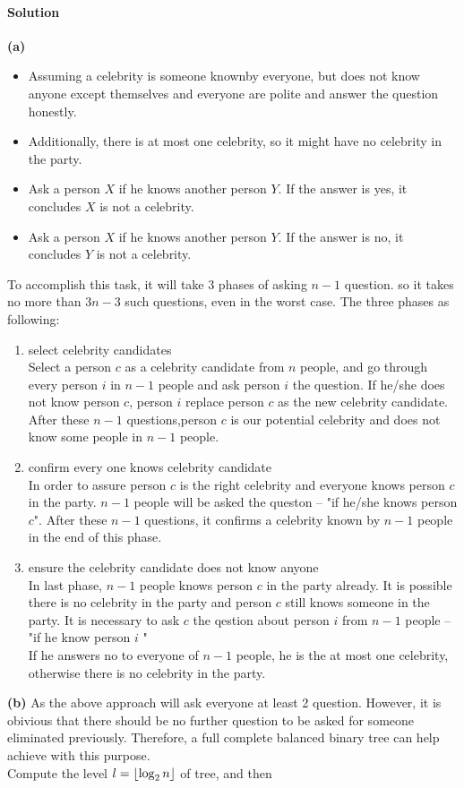 \documentclass[a4paper]{scrartcl}
\begin{document}
\paragraph{Solution}
{\bfseries(a)}
\begin{itemize}
  \item Assuming a celebrity is someone knownby everyone, but does not know anyone except themselves and everyone are polite and answer the question honestly.
  \item Additionally, there is at most one celebrity, so it might have no celebrity in the party.
  \item Ask a person $X$ if he knows another person $Y$. If the answer is yes, it concludes $X$ is not a celebrity.
  \item Ask a person $X$ if he knows another person $Y$. If the answer is no, it concludes $Y$ is not a celebrity.
\end{itemize}
To accomplish this task, it will take 3 phases of asking $n-1$ question. so it takes no more than $3n-3$ such questions, even in the worst case.
The three phases as following:
\begin{enumerate}
  \item select celebrity candidates\\
  Select a person $c$ as a celebrity candidate from $n$ people, and go through every person $i$ in $n-1$ people and ask person $i$ the question. If he/she does not know person $c$, person $i$ replace person $c$ as the new celebrity candidate. After these $n-1$ questions,person $c$ is our potential celebrity and does not know some people in $n-1$ people.
  \item confirm every one knows celebrity candidate\\
  In order to assure person $c$ is the right celebrity and everyone knows person $c$ in the party. $n-1$ people will be asked the queston -- "if he/she knows person $c$". After these $n-1$ questions, it confirms a celebrity known by $n-1$ people in the end of this phase.
  \item ensure the celebrity candidate does not know anyone\\
  In last phase, $n-1$ people knows person $c$ in the party already. It is possible there is no celebrity in the party and person $c$ still knows someone in the party. It is necessary to ask $c$ the qestion about person $i$ from $n-1$ people -- "if he know person $i$ "\\
  If he answers no to everyone of $n-1$ people, he is the at most one celebrity, otherwise there is no celebrity in the party.
\end{enumerate}
{\bfseries(b)} As the above approach will ask everyone at least 2 question. However, it is obivious that there should be no further question to be asked for someone eliminated previously. Therefore, a full complete balanced binary tree can help achieve with this purpose.\\
Compute the level $l =\left\lfloor \log_2{n} \right\rfloor$ of tree, and then
\end{document}

